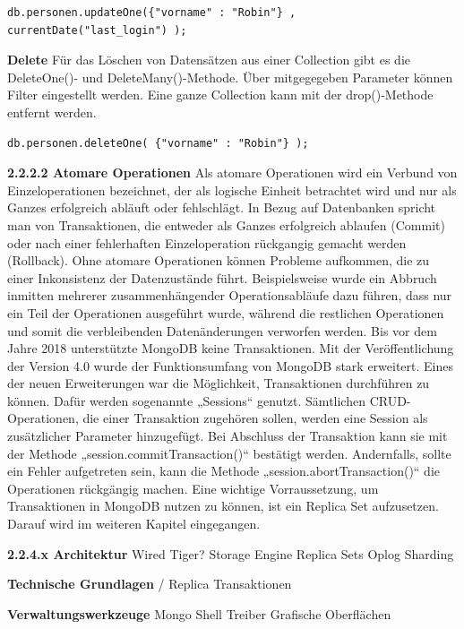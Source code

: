 \begin{lstlisting}
db.personen.updateOne({"vorname" : "Robin"} , currentDate("last_login") );
\end{lstlisting}

\textbf{Delete}
\newline
Für das Löschen von Datensätzen aus einer Collection gibt es die DeleteOne()- und DeleteMany()-Methode. Über mitgegegeben Parameter können Filter eingestellt werden. Eine ganze Collection kann mit der drop()-Methode entfernt werden.
\newline

\begin{lstlisting}
db.personen.deleteOne( {"vorname" : "Robin"} );
\end{lstlisting}

\textbf{2.2.2.2 Atomare Operationen}
\newline
Als atomare Operationen wird ein Verbund von Einzeloperationen bezeichnet, der als logische Einheit betrachtet wird und nur als Ganzes erfolgreich abläuft oder fehlschlägt. In Bezug auf Datenbanken spricht man von Transaktionen, die entweder als Ganzes erfolgreich ablaufen (Commit) oder nach einer fehlerhaften Einzeloperation rückgangig gemacht werden (Rollback). Ohne atomare Operationen können Probleme aufkommen, die zu einer Inkonsistenz der Datenzustände führt. Beispielsweise wurde ein Abbruch inmitten mehrerer zusammenhängender Operationsabläufe dazu führen,  dass nur ein Teil der Operationen ausgeführt wurde, während die restlichen Operationen und somit die verbleibenden Datenänderungen verworfen werden.
\newline
Bis vor dem Jahre 2018 unterstützte MongoDB keine Transaktionen. Mit der Veröffentlichung der Version 4.0 wurde der Funktionsumfang von MongoDB stark erweitert. Eines der neuen Erweiterungen war die Möglichkeit, Transaktionen durchführen zu können. Dafür werden sogenannte „Sessions“ genutzt. Sämtlichen CRUD-Operationen, die einer Transaktion zugehören sollen, werden eine Session als zusätzlicher Parameter hinzugefügt.  Bei Abschluss der Transaktion kann sie mit der Methode „session.commitTransaction()“ bestätigt werden. Andernfalls, sollte ein Fehler aufgetreten sein, kann die Methode „session.abortTransaction()“ die Operationen rückgängig machen. Eine wichtige Vorraussetzung, um Transaktionen in MongoDB nutzen zu können, ist ein Replica Set aufzusetzen. Darauf wird im weiteren Kapitel eingegangen. 
\newline

\textbf{2.2.4.x Architektur}
\newline 
Wired Tiger?
Storage Engine
Replica Sets
Oplog
Sharding
\newline

\textbf{Technische Grundlagen}
/
Replica
Transaktionen
\newline

\textbf{Verwaltungswerkzeuge}
Mongo Shell
Treiber
Grafische Oberflächen
